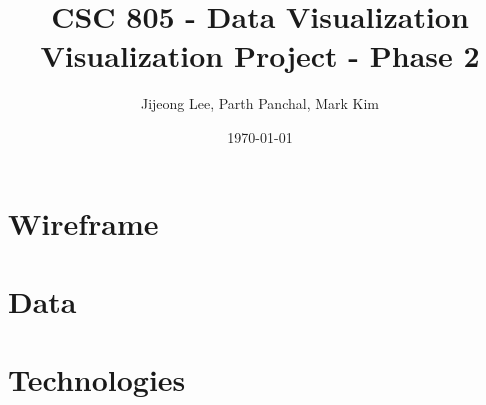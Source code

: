 \documentclass{article}
\title{CSC 805 - Data Visualization\\\large Visualization Project - Phase 2}
\author{Jijeong Lee, Parth Panchal, Mark Kim}
\date{\today}
\begin{document}
\maketitle

\section*{Wireframe}

\section*{Data}

\section*{Technologies}
\end{document}
